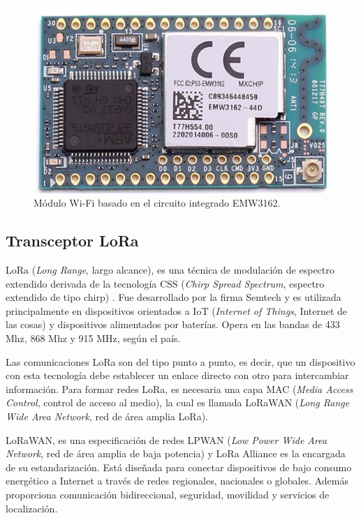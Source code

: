 \begin{figure}[h]
	\centering
	\includegraphics[scale=0.25]{./Figures/wifi_module.jpg}
	\caption{Módulo Wi-Fi basado en el circuito integrado EMW3162\protect\footnotemark.}
	\label{fig:cuadradoAzul}
\end{figure}


\subsection{Transceptor LoRa}

LoRa (\textit{Long Range}, largo alcance), es una técnica de modulación de espectro extendido derivada de la tecnología CSS (\textit{Chirp Spread Spectrum}, espectro extendido de tipo chirp) \citep{WEBSITE:9}. Fue desarrollado por la firma Semtech y es utilizada principalmente en dispositivos orientados a IoT (\textit{Internet of Things}, Internet de las cosas) y dispositivos alimentados por baterías. Opera en las bandas de 433 Mhz, 868 Mhz y 915 MHz, según el país.

Las comunicaciones LoRa son del tipo punto a punto, es decir, que un dispositivo con esta tecnología debe establecer un enlace directo con otro para intercambiar información. Para formar redes LoRa, es necesaria una capa MAC (\textit{Media Access Control}, control de acceso al medio), la cual es llamada LoRaWAN (\textit{Long Range Wide Area Network}, red de área amplia LoRa).

LoRaWAN, es una especificación de redes LPWAN (\textit{Low Power Wide Area Network}, red de área amplia de baja potencia) y LoRa Alliance es la encargada de su estandarización. Está diseñada para conectar dispositivos de bajo consumo energético a Internet a través de redes regionales, nacionales o globales. Además proporciona comunicación bidireccional, seguridad, movilidad y servicios de localización\citep{WEBSITE:10}.

